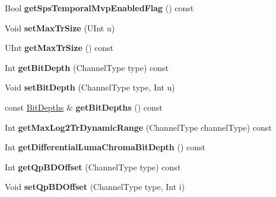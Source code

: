 \begin{DoxyCompactItemize}
\item 
\mbox{\label{class_t_com_s_p_s_a827c685220a82486a378dbc8252ac41c}} 
Bool {\bfseries get\+Sps\+Temporal\+Mvp\+Enabled\+Flag} () const
\item 
\mbox{\label{class_t_com_s_p_s_a3e74e66627b11e7c95df81233f879c8f}} 
Void {\bfseries set\+Max\+Tr\+Size} (U\+Int u)
\item 
\mbox{\label{class_t_com_s_p_s_ad7947cbffd25ad67e61a710f06a3ad2a}} 
U\+Int {\bfseries get\+Max\+Tr\+Size} () const
\item 
\mbox{\label{class_t_com_s_p_s_a8ad4254325844218905dfd22a4f8a310}} 
Int {\bfseries get\+Bit\+Depth} (Channel\+Type type) const
\item 
\mbox{\label{class_t_com_s_p_s_a109a8524a1c65da1c8c57d3e239a0f9d}} 
Void {\bfseries set\+Bit\+Depth} (Channel\+Type type, Int u)
\item 
\mbox{\label{class_t_com_s_p_s_a9e29119c6bf96aa0ccbf289dc03927d7}} 
const \hyperlink{struct_bit_depths}{Bit\+Depths} \& {\bfseries get\+Bit\+Depths} () const
\item 
\mbox{\label{class_t_com_s_p_s_a7407d043ce056aff1f8446386671a873}} 
Int {\bfseries get\+Max\+Log2\+Tr\+Dynamic\+Range} (Channel\+Type channel\+Type) const
\item 
\mbox{\label{class_t_com_s_p_s_a4b25d88eec90ed916e0bd097b49fbe50}} 
Int {\bfseries get\+Differential\+Luma\+Chroma\+Bit\+Depth} () const
\item 
\mbox{\label{class_t_com_s_p_s_a74b9c64afdacfff5de67c2d9bb69e59a}} 
Int {\bfseries get\+Qp\+B\+D\+Offset} (Channel\+Type type) const
\item 
\mbox{\label{class_t_com_s_p_s_a7f7ca85839194fbceb65d4dde52814ca}} 
Void {\bfseries set\+Qp\+B\+D\+Offset} (Channel\+Type type, Int i)
\item 
\mbox{\label{class_t_com_s_p_s_a11caae1a6ce57c9c6f77eab2a9d1e665}} 

\end{DoxyCompactItemize}
